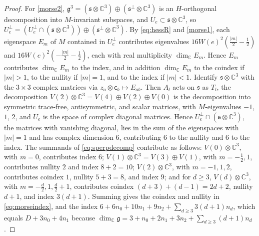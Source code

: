 \documentclass [leqno, 10pt]{amsart}
\theoremstyle{definition}
\numberwithin{equation}{section}
\newcommand{\g}{\mathfrak{g}}
\newcommand{\com}{\mathbb C}
\newcommand{\subs}{\mathfrak{s}}
\newcommand{\Usp}{U}
\newcommand{\Uperp}{\Usp^{\perp}}
\begin{document}
\begin{proof}
For \ref{morse2}, $\g^{3} = (\subs \otimes \com^{3}) \oplus (\subs^{\perp}\otimes \com^{3})$ is an $H$-orthogonal decomposition into $M$-invariant subspaces, and $\Usp_{e} \subset \subs \otimes \com^{3}$, so $\Uperp_{e} = (\Uperp_{e} \cap (\subs \otimes \com^{3})) \oplus (\subs^{\perp}\otimes \com^{3})$. By \eqref{eq:hessR} and \ref{morse1}, each eigenspace $E_{m}$ of $M$ contained in $\Uperp_{e}$ contributes eigenvalues $16W(e)^{2}(\tfrac{|m|}{2} - \tfrac{1}{2})$ and $16W(e)^{2}(-\tfrac{|m|}{2} - \tfrac{1}{2})$, each with real multiplicity $\dim_{\com}E_{m}$. Hence $E_{m}$ contributes $\dim_{\com}E_{m}$ to the index, and in addition $\dim_{\com}E_{m}$ to the coindex if $|m| > 1$, to the nullity if $|m| = 1$, and to the index if $|m| < 1$. Identify $\subs \otimes \com^{3}$ with the $3\times 3$ complex matrices via $z_{a} \otimes \mathsf{c}_{b} \mapsto E_{ab}$. Then $A_{l}$ acts on $\subs$ as $T_{l}$, the decomposition $V(2) \otimes \com^{3} = V(4) \oplus V(2) \oplus V(0)$ is the decomposition into symmetric trace-free, antisymmetric, and scalar matrices, with $M$-eigenvalues $-1$, $1$, $2$, and $\Usp_{e}$ is the space of complex diagonal matrices. Hence $\Uperp_{e} \cap (\subs \otimes \com^{3})$, the matrices with vanishing diagonal, lies in the sum of the eigenspaces with $|m| = 1$ and has complex dimension $6$, contributing $6$ to the nullity and $6$ to the index. The summands of \eqref{eq:sperpdecomp} contribute as follows: $V(0)\otimes\com^{3}$, with $m = 0$, contributes index $6$; $V(1)\otimes\com^{3} = V(3) \oplus V(1)$, with $m = -\tfrac{1}{2}, 1$, contributes nullity $2$ and index $8 + 2 = 10$; $V(2)\otimes\com^{3}$, with $m = -1, 1, 2$, contributes coindex $1$, nullity $5 + 3 = 8$, and index $9$; and for $d \geq 3$, $V(d)\otimes\com^{3}$, with $m = -\tfrac{d}{2}, 1, \tfrac{d}{2}+1$, contributes coindex $(d+3) + (d-1) = 2d+2$, nullity $d+1$, and index $3(d+1)$. Summing gives the coindex and nullity in \eqref{eq:morseindex}, and the index $6 + 6n_{0} + 10n_{1} + 9n_{2} + \sum_{d \geq 3}3(d+1)n_{d}$, which equals $D + 3n_{0} + 4n_{1}$ because $\dim_{\com}\g = 3 + n_{0} + 2n_{1} + 3n_{2} + \sum_{d \geq 3}(d+1)n_{d}$.


\end{proof}
\end{document}
